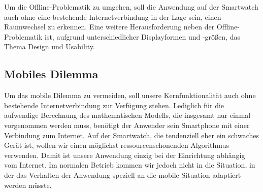 Um die Offline-Problematik zu umgehen, soll die Anwendung auf der Smartwatch auch ohne eine bestehende Internetverbindung in der Lage sein, einen Raumwechsel zu erkennen. Eine weitere Herausforderung neben der Offline-Problematik ist, aufgrund unterschiedlicher Displayformen und -größen, das Thema Design und Usability.

\subsection{Mobiles Dilemma}
Um das mobile Dilemma zu vermeiden, soll unsere Kernfunktionalität auch ohne bestehende Internetverbindung zur Verfügung stehen. Lediglich für die aufwendige Berechnung des mathematischen Modells, die insgesamt nur einmal vorgenommen werden muss, benötigt der Anwender sein Smartphone mit einer Verbindung zum Internet. Auf der Smartwatch, die tendenziell eher ein schwaches Gerät ist, wollen wir einen möglichst ressourcenschonenden Algorithmus verwenden. Damit ist unsere Anwendung einzig bei der Einrichtung abhängig vom Internet. Im normalen Betrieb kommen wir jedoch nicht in die Situation, in der das Verhalten der Anwendung speziell an die mobile Situation adaptiert werden müsste.


